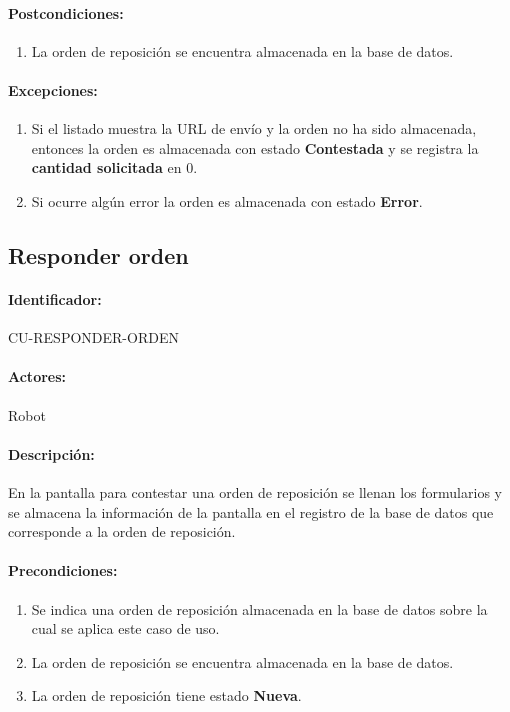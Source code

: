 \paragraph{Postcondiciones:}
\begin{enumerate}
  \item La orden de reposición se encuentra almacenada en la base de datos.
\end{enumerate}
\paragraph{Excepciones:}
\begin{enumerate}
  \item Si el listado muestra la URL de envío y la orden no ha sido almacenada, entonces la orden es almacenada con estado \textbf{Contestada} y se registra la \textbf{cantidad solicitada} en 0.
  \item Si ocurre algún error la orden es almacenada con estado \textbf{Error}.
\end{enumerate}


\subsection{Responder orden}\label{cu-responder-orden}
\paragraph{Identificador:}
CU-RESPONDER-ORDEN
\paragraph{Actores:}
Robot
\paragraph{Descripción:}
En la pantalla para contestar una orden de reposición se llenan los formularios y se almacena la información de la pantalla en el registro de la base de datos que corresponde a la orden de reposición.
\paragraph{Precondiciones:}
\begin{enumerate}
  \item Se indica una orden de reposición almacenada en la base de datos sobre la cual se aplica este caso de uso.
  \item La orden de reposición se encuentra almacenada en la base de datos.
  \item La orden de reposición tiene estado \textbf{Nueva}.
\end{enumerate}
